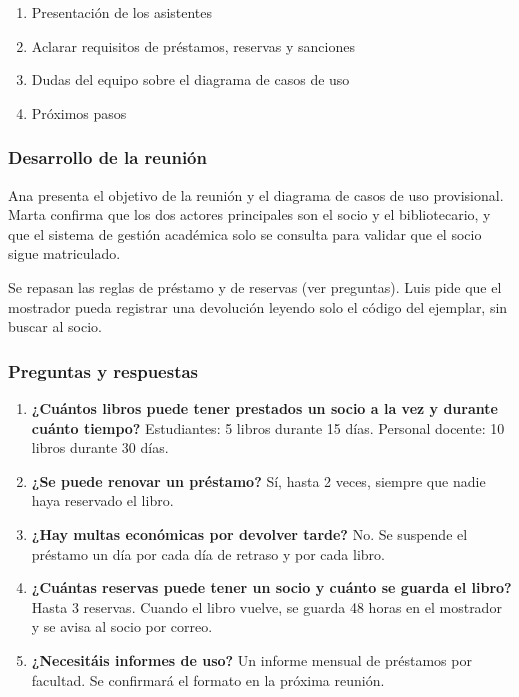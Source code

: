 \begin{enumerate}
\item Presentación de los asistentes
\item Aclarar requisitos de préstamos, reservas y sanciones
\item Dudas del equipo sobre el diagrama de casos de uso
\item Próximos pasos
\end{enumerate}

\subsubsection*{Desarrollo de la reunión}

Ana presenta el objetivo de la reunión y el diagrama de casos de uso provisional. Marta confirma que los dos actores principales son el socio y el bibliotecario, y que el sistema de gestión académica solo se consulta para validar que el socio sigue matriculado.

Se repasan las reglas de préstamo y de reservas (ver preguntas). Luis pide que el mostrador pueda registrar una devolución leyendo solo el código del ejemplar, sin buscar al socio.

\subsubsection*{Preguntas y respuestas}

\begin{enumerate}
\item \textbf{¿Cuántos libros puede tener prestados un socio a la vez y durante cuánto tiempo?}
Estudiantes: 5 libros durante 15 días. Personal docente: 10 libros durante 30 días.
\item \textbf{¿Se puede renovar un préstamo?}
Sí, hasta 2 veces, siempre que nadie haya reservado el libro.
\item \textbf{¿Hay multas económicas por devolver tarde?}
No. Se suspende el préstamo un día por cada día de retraso y por cada libro.
\item \textbf{¿Cuántas reservas puede tener un socio y cuánto se guarda el libro?}
Hasta 3 reservas. Cuando el libro vuelve, se guarda 48 horas en el mostrador y se avisa al socio por correo.
\item \textbf{¿Necesitáis informes de uso?}
Un informe mensual de préstamos por facultad. Se confirmará el formato en la próxima reunión.
\end{enumerate}

